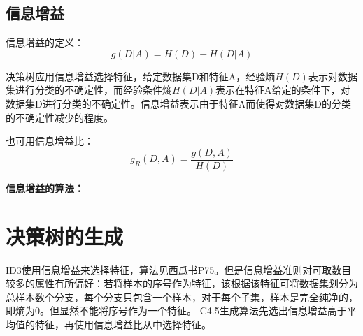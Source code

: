 \documentclass[UTF8]{ctexart} %
\begin{document}
		\subsection{信息增益}
			信息增益的定义：
			\[g(D|A)=H(D)-H(D|A)\]
			
			决策树应用信息增益选择特征，给定数据集D和特征A，经验熵$H(D)$表示对数据集进行分类的不确定性，而经验条件熵$H(D|A)$表示在特征A给定的条件下，对数据集D进行分类的不确定性。信息增益表示由于特征A而使得对数据集D的分类的不确定性减少的程度。
			
			也可用信息增益比：
			\[g_R(D,A)=\frac{g(D,A)}{H(D)}\]
			
			\textbf{信息增益的算法：}
			\begin{figure}[H]
			\end{figure}
			\begin{figure}[H]
			\end{figure}
	\section{决策树的生成}
		ID3使用信息增益来选择特征，算法见西瓜书P75。但是信息增益准则对可取数目较多的属性有所偏好：若将样本的序号作为特征，该根据该特征可将数据集划分为总样本数个分支，每个分支只包含一个样本，对于每个子集，样本是完全纯净的，即熵为0。但显然不能将序号作为一个特征。	
		C4.5生成算法先选出信息增益高于平均值的特征，再使用信息增益比从中选择特征。
		
\end{document}
